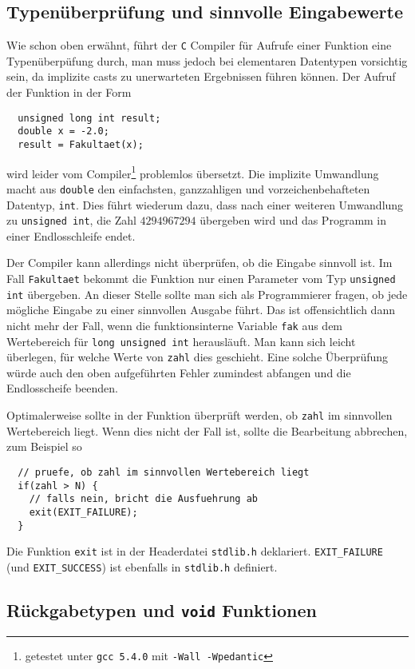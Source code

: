 \subsection{Typenüberprüfung und sinnvolle Eingabewerte}

Wie schon oben erwähnt, führt der \texttt{C} Compiler für Aufrufe einer Funktion eine Typenüberpüfung durch, man muss jedoch bei elementaren Datentypen vorsichtig sein, da implizite casts zu unerwarteten Ergebnissen führen können.
Der Aufruf der Funktion in der Form
\begin{lstlisting}
  unsigned long int result;
  double x = -2.0;
  result = Fakultaet(x);
\end{lstlisting}
wird leider vom Compiler\footnote{getestet unter \texttt{gcc 5.4.0} mit \texttt{-Wall -Wpedantic}} problemlos übersetzt.
Die implizite Umwandlung macht aus \texttt{double} den einfachsten, ganzzahligen und vorzeichenbehafteten Datentyp, \texttt{int}.
Dies führt wiederum dazu, dass nach einer weiteren Umwandlung zu \texttt{unsigned int}, die Zahl $4294967294$ übergeben wird und das Programm in einer Endlosschleife endet.

Der Compiler kann allerdings nicht überprüfen, ob die Eingabe sinnvoll ist.
Im Fall \verb|Fakultaet| bekommt die Funktion nur einen Parameter vom Typ \verb|unsigned int| übergeben. 
An dieser Stelle sollte man sich als Programmierer fragen, ob jede mögliche Eingabe zu einer sinnvollen Ausgabe führt. 
Das ist offensichtlich dann nicht mehr der Fall, wenn die funktionsinterne Variable \verb|fak| aus dem Wertebereich für \verb|long unsigned int| herausläuft. 
Man kann sich leicht überlegen, für welche Werte von \verb|zahl| dies geschieht.
Eine solche Überprüfung würde auch den oben aufgeführten Fehler zumindest abfangen und die Endlosscheife beenden.

Optimalerweise sollte in der Funktion überprüft werden, ob \verb|zahl| im sinnvollen Wertebereich liegt. 
Wenn dies nicht der Fall ist, sollte die Bearbeitung abbrechen, zum Beispiel so
\begin{lstlisting}
  // pruefe, ob zahl im sinnvollen Wertebereich liegt
  if(zahl > N) {
    // falls nein, bricht die Ausfuehrung ab
    exit(EXIT_FAILURE);
  }
\end{lstlisting}
Die Funktion \verb|exit| ist in der Headerdatei \verb|stdlib.h| deklariert.
\verb|EXIT_FAILURE| (und \verb|EXIT_SUCCESS|) ist ebenfalls in \verb|stdlib.h| definiert.

\subsection{Rückgabetypen und \texttt{void} Funktionen}

